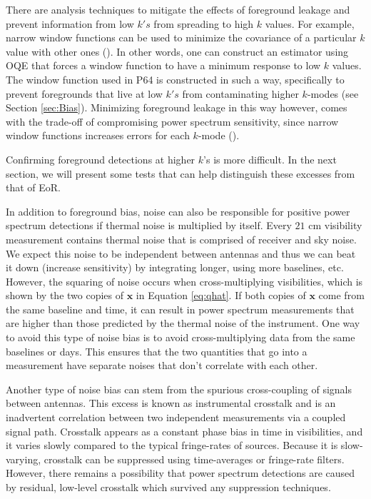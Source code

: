 \documentclass[preprint2,numberedappendix,tighten]{aastex6}  %
\begin{document}
There are analysis techniques to mitigate the effects of foreground leakage and prevent information from low $k's$ from spreading to high $k$ values. For example, narrow window functions can be used to minimize the covariance of a particular $k$ value with other ones (\citealt{liu_et_al2014b}). In other words, one can construct an estimator using OQE that forces a window function to have a minimum response to low $k$ values. The window function used in P64 is constructed in such a way, specifically to prevent foregrounds that live at low $k's$ from contaminating higher $k$-modes (see Section \ref{sec:Bias}). Minimizing foreground leakage in this way however, comes with the trade-off of compromising power spectrum sensitivity, since narrow window functions increases errors for each $k$-mode (\citealt{liu_et_al2014b}). 

Confirming foreground detections at higher $k$'s is more difficult. In the next section, we will present some tests that can help distinguish these excesses from that of EoR. 

In addition to foreground bias, noise can also be responsible for positive power spectrum detections if thermal noise is multiplied by itself. Every $21$ cm visibility measurement contains thermal noise that is comprised of receiver and sky noise. We expect this noise to be independent between antennas and thus we can beat it down (increase sensitivity) by integrating longer, using more baselines, etc. However, the squaring of noise occurs when cross-multiplying visibilities, which is shown by the two copies of $\textbf{x}$ in Equation \eqref{eq:qhat}. If both copies of $\textbf{x}$ come from the same baseline and time, it can result in power spectrum measurements that are higher than those predicted by the thermal noise of the instrument. One way to avoid this type of noise bias is to avoid cross-multiplying data from the same baselines or days. This ensures that the two quantities that go into a measurement have separate noises that don't correlate with each other. 

Another type of noise bias can stem from the spurious cross-coupling of signals between antennas. This excess is known as instrumental crosstalk and is an inadvertent correlation between two independent measurements via a coupled signal path. Crosstalk appears as a constant phase bias in time in visibilities, and it varies slowly compared to the typical fringe-rates of sources. Because it is slow-varying, crosstalk can be suppressed using time-averages or fringe-rate filters. However, there remains a possibility that power spectrum detections are caused by residual, low-level crosstalk which survived any suppression techniques. 
\end{document}
